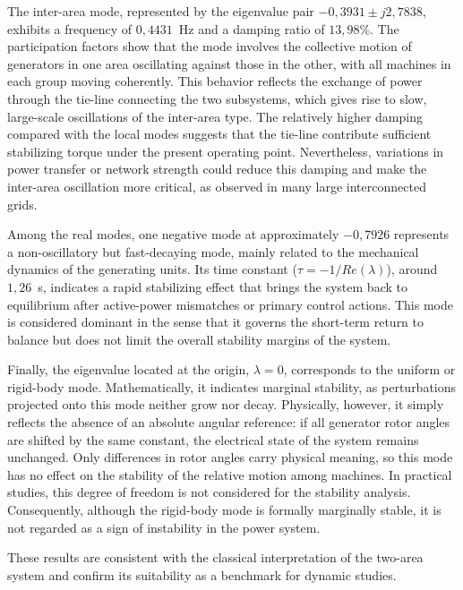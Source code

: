 The inter-area mode, represented by the eigenvalue pair $-0,3931 \pm j2,7838$, exhibits a frequency of  $0,4431$~Hz and a damping 
ratio of $13,98\%$. The participation factors show that the mode involves the collective motion of generators in one area oscillating 
against those in the other, with all machines in each group moving coherently. This behavior reflects the exchange of power 
through the tie-line connecting the two subsystems, which gives rise to slow, large-scale oscillations of the inter-area type. 
The relatively higher damping compared with the local modes suggests that the tie-line 
contribute sufficient stabilizing torque under the present operating point. Nevertheless, variations in power transfer or network 
strength could reduce this damping and make the inter-area oscillation more critical, as observed in many large interconnected grids.

Among the real modes, one negative mode at approximately $-0,7926$ represents a non-oscillatory but fast-decaying mode, 
mainly related to the mechanical dynamics of the generating units. Its time constant ($\tau = -1/Re(\lambda)$), around $1,26$~s, indicates a rapid stabilizing
effect that brings the system back to equilibrium after active-power mismatches or primary control actions. This mode is considered 
dominant in the sense that it governs the short-term return to balance but does not limit the overall stability margins of the system.

Finally, the eigenvalue located at the origin, $\lambda = 0$, corresponds to the uniform or rigid-body mode. 
Mathematically, it indicates marginal stability, as perturbations projected onto this mode neither grow nor decay.
Physically, however, it simply reflects the absence of an absolute angular reference: if all generator rotor angles are shifted by the same constant, 
the electrical state of the system remains unchanged. Only differences in rotor angles carry physical meaning, so this mode has no effect on the stability 
of the relative motion among machines. In practical studies, this degree of freedom is not considered for the stability analysis. 
Consequently, although the rigid-body mode is formally marginally stable, it is not regarded as a sign of instability in the power system.
 
These results are consistent with the classical interpretation of the two-area system and confirm its suitability as a benchmark
 for dynamic studies.



